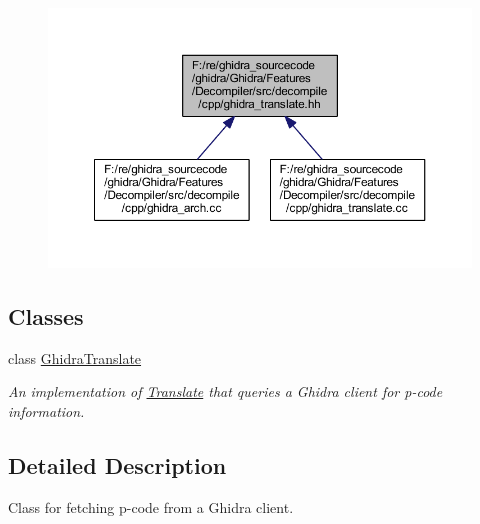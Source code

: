 \nopagebreak
\begin{figure}[H]
\begin{center}
\leavevmode
\includegraphics[width=350pt]{ghidra__translate_8hh__dep__incl}
\end{center}
\end{figure}
\subsection*{Classes}
\begin{DoxyCompactItemize}
\item 
class \mbox{\hyperlink{class_ghidra_translate}{Ghidra\+Translate}}
\begin{DoxyCompactList}\small\item\em An implementation of \mbox{\hyperlink{class_translate}{Translate}} that queries a Ghidra client for p-\/code information. \end{DoxyCompactList}\end{DoxyCompactItemize}


\subsection{Detailed Description}
Class for fetching p-\/code from a Ghidra client. 

